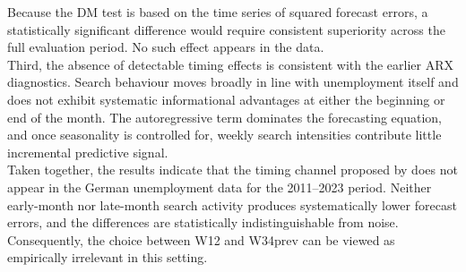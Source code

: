 \documentclass[12pt,a4paper]{article}
\begin{document}
Because the DM test is based on the time series of squared forecast errors, a statistically significant difference would require consistent superiority across the full evaluation period. No such effect appears in the data.\\
Third, the absence of detectable timing effects is consistent with the earlier ARX diagnostics.
Search behaviour moves broadly in line with unemployment itself and does not exhibit systematic informational advantages at either the beginning or end of the month. The autoregressive term dominates the forecasting equation, and once seasonality is controlled for, weekly search intensities contribute little incremental predictive signal.\\
Taken together, the results indicate that the timing channel proposed by \citet{Askitas} does not appear in the German unemployment data for the 2011–2023 period.
Neither early-month nor late-month search activity produces systematically lower forecast errors, and the differences are statistically indistinguishable from noise.
Consequently, the choice between W12 and W34prev can be viewed as empirically irrelevant in this setting.
\end{document}
